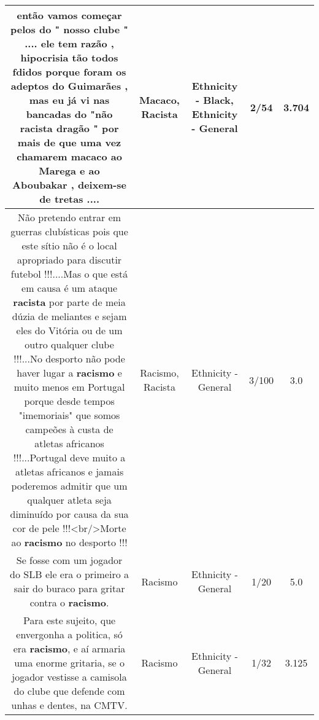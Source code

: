 \documentclass[11pt]{article}
\newlength\mylength
\begin{document}
\begin{center}
\begin{longtable}{|C{.65\mylength}|C{.30\mylength}|C{.12\mylength}|C{.12\mylength}|C{.12\mylength}|}
  \small então vamos começar pelos do " nosso clube " ....  ele tem razão , hipocrisia tão todos fdidos porque foram os adeptos do Guimarães , mas eu já vi nas bancadas do "não \textbf{racista} dragão " por mais de que uma vez chamarem \textbf{macaco} ao Marega e ao Aboubakar , deixem-se de tretas   ....\normalsize   & Macaco, Racista & Ethnicity - Black, Ethnicity - General & 2/54 & 3.704 \\  \hline
  \small Não pretendo entrar em guerras clubísticas pois que este sítio não é o local apropriado para discutir futebol !!!....Mas o que está em causa é um ataque \textbf{racista} por parte de meia dúzia de meliantes e sejam eles do Vitória ou de um outro qualquer clube !!!...No desporto não pode haver lugar a \textbf{racismo} e muito menos em Portugal porque desde tempos  "imemoriais" que somos campeões à custa de atletas africanos !!!...Portugal deve muito a atletas africanos e jamais poderemos admitir que um qualquer atleta seja diminuído por causa da sua cor de pele !!!<br/>Morte ao \textbf{racismo} no desporto !!!\normalsize   & Racismo, Racista & Ethnicity - General & 3/100 & 3.0 \\  \hline
  \small Se fosse com um jogador do SLB ele era o primeiro a sair do buraco para gritar contra o \textbf{racismo}.\normalsize   & Racismo & Ethnicity - General & 1/20 & 5.0 \\  \hline
  \small Para este sujeito, que envergonha a politica, só era \textbf{racismo}, e aí armaria uma enorme gritaria, se o jogador vestisse a camisola do clube que defende com unhas e dentes, na CMTV.\normalsize   & Racismo & Ethnicity - General & 1/32 & 3.125 \\  \hline
  
\end{longtable}
\end{center}
\end{document}
